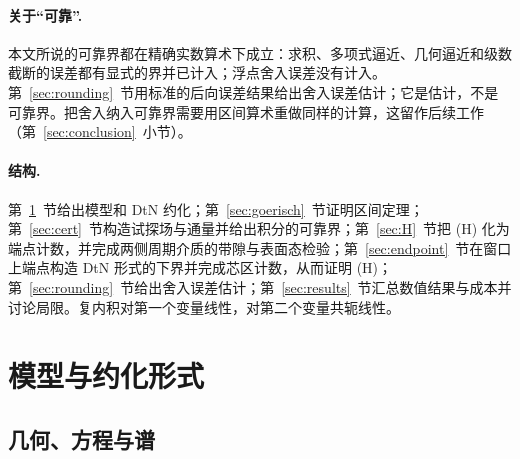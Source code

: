 \documentclass[11pt,a4paper,fontset=fandol]{ctexart}
\theoremstyle{plain}
\theoremstyle{definition}
\theoremstyle{remark}
\begin{document}
\paragraph{关于“可靠”.} 本文所说的可靠界都在精确实数算术下成立：求积、多项式逼近、几何逼近和级数截断的误差都有显式的界并已计入；浮点舍入误差没有计入。第~\ref{sec:rounding}~节用标准的后向误差结果给出舍入误差估计；它是估计，不是可靠界。把舍入纳入可靠界需要用区间算术重做同样的计算，这留作后续工作（第~\ref{sec:conclusion}~小节）。

\paragraph{结构.} 第~\ref{sec:model}~节给出模型和 DtN 约化；第~\ref{sec:goerisch}~节证明区间定理；第~\ref{sec:cert}~节构造试探场与通量并给出积分的可靠界；第~\ref{sec:H}~节把 (H) 化为端点计数，并完成两侧周期介质的带隙与表面态检验；第~\ref{sec:endpoint}~节在窗口上端点构造 DtN 形式的下界并完成芯区计数，从而证明 (H)；第~\ref{sec:rounding}~节给出舍入误差估计；第~\ref{sec:results}~节汇总数值结果与成本并讨论局限。复内积对第一个变量线性，对第二个变量共轭线性。

\section{模型与约化形式}
\label{sec:model}
\subsection{几何、方程与谱}
\end{document}

